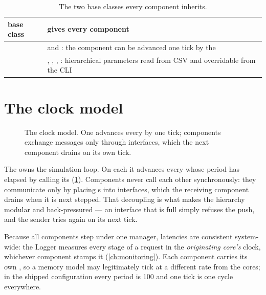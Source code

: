 \begin{table}[htbp]\centering\small
\caption{The two base classes every component inherits.}\label{tab:base-classes}
\begin{tabularx}{\textwidth}{@{}lY@{}}
\toprule base class & gives every component \\ \midrule
{} &  and : the component can be advanced one tick by the  \\
 & , , , : hierarchical parameters read from CSV and overridable from the CLI \\
\bottomrule
\end{tabularx}
\end{table}

\section{The clock model}

\begin{figure}[htbp]\centering
\begin{adjustbox}{max width=\textwidth}\end{adjustbox}
\caption{The clock model. One  advances every  by one tick;
components exchange messages only through interfaces, which the next component drains on its
own tick.}
\label{fig:clock-loop}
\end{figure}

The  owns the simulation loop. On each  it advances every
 whose period has elapsed by calling its 
(\cref{fig:clock-loop}). Components never call each other synchronously: they communicate only by
placing s into interfaces, which the receiving component drains when it is next
stepped. That decoupling is what makes the hierarchy modular and back-pressured --- an interface
that is full simply refuses the push, and the sender tries again on its next tick.

Because all components step under one manager, latencies are consistent system-wide: the Logger
measures every stage of a request in the \emph{originating core's} clock, whichever component
stamps it (\cref{ch:monitoring}). Each component carries its own , so a
memory model may legitimately tick at a different rate from the cores; in the shipped
configuration every period is 100 and one tick is one cycle everywhere.

